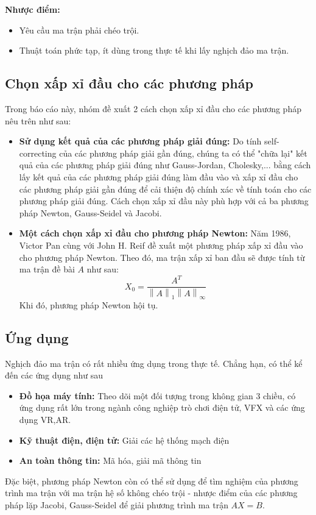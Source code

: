         \par \textbf{Nhược điểm:}
        \begin{itemize}
            \item Yêu cầu ma trận phải chéo trội.
            \item Thuật toán phức tạp, ít dùng trong thực tế khi lấy nghịch đảo ma trận.
        \end{itemize}

\subsection{Chọn xấp xỉ đầu cho các phương pháp}

    Trong báo cáo này, nhóm đề xuất 2 cách chọn xấp xỉ đầu cho các phương pháp nêu trên như sau:

    \begin{itemize}
        \item \textbf{Sử dụng kết quả của các phương pháp giải đúng:} Do tính self-correcting của các phương pháp giải gần đúng, chúng ta có thể "chữa lại" kết quả của các phương pháp giải đúng như Gauss-Jordan, Cholesky,... bằng cách lấy kết quả của các phương pháp giải đúng làm đầu vào và xấp xỉ đầu cho các phương pháp giải gần đúng để cải thiện độ chính xác về tính toán cho các phương pháp giải đúng. Cách chọn xấp xỉ đầu này phù hợp với cả ba phương pháp Newton, Gauss-Seidel và Jacobi.
        
        \item \textbf{Một cách chọn xấp xỉ đầu cho phương pháp Newton:} Năm 1986, Victor Pan cùng với John H. Reif \cite{PanReif} đề xuất một phương pháp xấp xỉ đầu vào cho phương pháp Newton. Theo đó, ma trận xấp xỉ ban đầu sẽ được tính từ ma trận đề bài $A$ như sau:
        $$ X_{0} = \frac{A^{T}}{\left\lVert A \right\rVert_{1}\left\lVert A \right\rVert_{\infty}} $$
        Khi đó, phương pháp Newton hội tụ.
    \end{itemize} 

\subsection{Ứng dụng}

    Nghịch đảo ma trận có rất nhiều ứng dụng trong thực tế. Chẳng hạn, có thể kể đến các ứng dụng như sau
    \begin{itemize}
        \item \textbf{Đồ họa máy tính:} Theo dõi một đối tượng trong không gian 3 chiều, có ứng dụng rất lớn trong ngành công nghiệp trò chơi điện tử, VFX và các ứng dụng VR,AR.
        \item \textbf{Kỹ thuật điện, điện tử:} Giải các hệ thống mạch điện
        \item \textbf{An toàn thông tin:} Mã hóa, giải mã thông tin
    \end{itemize}

    Đặc biệt, phương pháp Newton còn có thể sử dụng để tìm nghiệm của phương trình ma trận với ma trận hệ số không chéo trội - nhược điểm của các phương pháp lặp Jacobi, Gauss-Seidel để giải phương trình ma trận $AX = B$.
    
